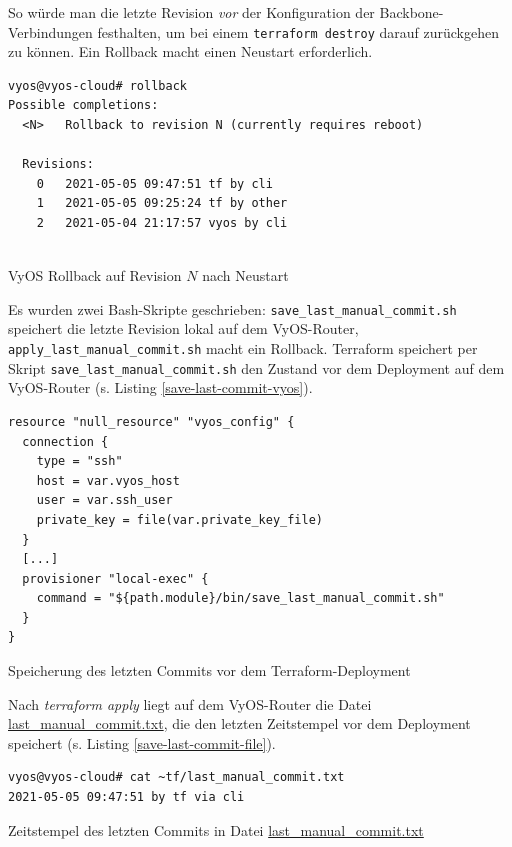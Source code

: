 So würde man die letzte Revision \textit{vor} der Konfiguration der Backbone-Verbindungen festhalten, um bei einem \texttt{terraform destroy} darauf zurückgehen zu können. Ein \gls{Rollback} macht einen Neustart erforderlich.
\begin{listing}[h]
\begin{verbatim}
vyos@vyos-cloud# rollback
Possible completions:
  <N>   Rollback to revision N (currently requires reboot)

  Revisions:
    0   2021-05-05 09:47:51 tf by cli
    1   2021-05-05 09:25:24 tf by other
    2   2021-05-04 21:17:57 vyos by cli
    
\end{verbatim}
\caption{VyOS Rollback auf Revision $N$ nach Neustart}
\label{rollback-cmd-vyos}
\end{listing}\FloatBarrier
Es wurden zwei Bash-Skripte geschrieben: \texttt{save\_last\_manual\_commit.sh} speichert die letzte Revision lokal auf dem VyOS-Router, \texttt{apply\_last\_manual\_commit.sh} macht ein \gls{Rollback}. Terraform speichert per Skript \texttt{save\_last\_manual\_commit.sh} den Zustand vor dem \gls{Deployment} auf dem VyOS-Router (s. Listing \ref{save-last-commit-vyos}).
\begin{listing}[h]
\begin{verbatim}
resource "null_resource" "vyos_config" {
  connection {
    type = "ssh"
    host = var.vyos_host
    user = var.ssh_user
    private_key = file(var.private_key_file)
  }
  [...]
  provisioner "local-exec" {
    command = "${path.module}/bin/save_last_manual_commit.sh"
  }
}

\end{verbatim}
\caption{Speicherung des letzten Commits vor dem Terraform-Deployment}
\label{save-last-commit-vyos}
\end{listing}\FloatBarrier
Nach \textit{terraform apply} liegt auf dem VyOS-Router die Datei \underline{last\_manual\_commit.txt}, die den letzten Zeitstempel vor dem Deployment speichert (s. Listing \ref{save-last-commit-file}).
\begin{listing}[h]
\begin{verbatim}
vyos@vyos-cloud# cat ~tf/last_manual_commit.txt
2021-05-05 09:47:51 by tf via cli
\end{verbatim}
\caption{Zeitstempel des letzten Commits in Datei \underline{last\_manual\_commit.txt}}
\label{save-last-commit-file}
\end{listing}\FloatBarrier
